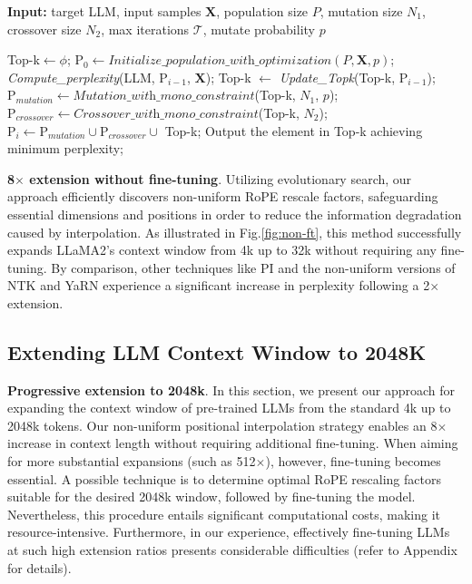 \begin{algorithm}[t]
	\small
	\caption{The search algorithm}
	\textbf{Input:} target LLM, input samples $\mathbf{X}$, population size $P$, mutation size $N_1$, crossover size $N_2$, max iterations $\mathcal{T}$, mutate probability $p$\\

	\begin{algorithmic}[1]
		\label{alg:search}
		\STATE Top-k$\leftarrow \phi$;
		\STATE $\text{P}_0 \gets \textit{Initialize\_population\_with\_optimization}(P, \mathbf{X}, p)$;
		\STATE \textit{Compute\_perplexity}(LLM, $\text{P}_{i-1}$, $\mathbf{X}$);
		\STATE Top-k $\gets$ \textit{Update\_Topk}(Top-k, $\text{P}_{i-1}$);
		\STATE $\text{P}_{mutation} \gets \textit{Mutation\_with\_mono\_constraint}$(Top-k, $N_1$, $p$);
		\STATE $\text{P}_{crossover} \gets \textit{Crossover\_with\_mono\_constraint}$(Top-k, $N_2$);
		\STATE $\text{P}_i \gets \text{P}_{mutation} \cup \text{P}_{crossover} \cup$ Top-k;
		\ENDFOR
		\STATE Output the element in Top-k achieving minimum perplexity;
	\end{algorithmic}
\end{algorithm}

\textbf{8$\times$ extension without fine-tuning}. Utilizing evolutionary search, our approach efficiently discovers non-uniform RoPE rescale factors, safeguarding essential dimensions and positions in order to reduce the information degradation caused by interpolation. As illustrated in Fig.\ref{fig:non-ft}, this method successfully expands LLaMA2’s context window from 4k up to 32k without requiring any fine-tuning. By comparison, other techniques like PI and the non-uniform versions of NTK and YaRN experience a significant increase in perplexity following a 2$\times$ extension.

\subsection{Extending LLM Context Window to 2048K}
\label{sec:extendto2048k}

\textbf{Progressive extension to 2048k}. In this section, we present our approach for expanding the context window of pre-trained LLMs from the standard 4k up to 2048k tokens. Our non-uniform positional interpolation strategy enables an 8$\times$ increase in context length without requiring additional fine-tuning. When aiming for more substantial expansions (such as 512$\times$), however, fine-tuning becomes essential. A possible technique is to determine optimal RoPE rescaling factors suitable for the desired 2048k window, followed by fine-tuning the model. Nevertheless, this procedure entails significant computational costs, making it resource-intensive. Furthermore, in our experience, effectively fine-tuning LLMs at such high extension ratios presents considerable difficulties (refer to Appendix for details).

